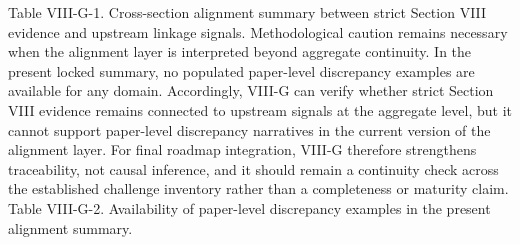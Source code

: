 {}Table VIII-G-1. Cross-section alignment summary between strict Section VIII evidence and upstream linkage signals.\markdownRendererInterblockSeparator
{}\markdownRendererInterblockSeparator
{}Methodological caution remains necessary when the alignment layer is interpreted beyond aggregate continuity. In the present locked summary, no populated paper-level discrepancy examples are available for any domain. Accordingly, VIII-G can verify whether strict Section VIII evidence remains connected to upstream signals at the aggregate level, but it cannot support paper-level discrepancy narratives in the current version of the alignment layer.\markdownRendererParagraphSeparator
{}For final roadmap integration, VIII-G therefore strengthens traceability, not causal inference, and it should remain a continuity check across the established challenge inventory rather than a completeness or maturity claim.\markdownRendererParagraphSeparator
{}Table VIII-G-2. Availability of paper-level discrepancy examples in the present alignment summary.\markdownRendererInterblockSeparator
{}\markdownRendererInterblockSeparator
